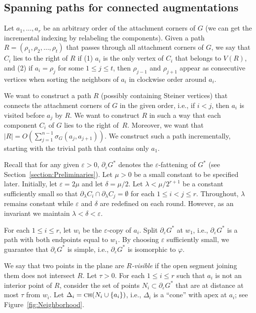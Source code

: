 \documentclass[a4paper, 11pt]{article}
\newcommand{\ch}[1]{\ensuremath{\textsc{ch}(#1)}}
\begin{document}
\subsection{Spanning paths for connected augmentations}\label{section:Spanning paths for connected augmentations}
Let $a_1, \ldots, a_r$ be an arbitrary order of the attachment corners of $G$ (we can get the incremental indexing by relabeling the components). 
Given a path $R = (\rho_1, \rho_2, \ldots, \rho_t)$ that passes through all attachment corners of $G$, we say that $C_i$ lies to the right of $R$ if (1) $a_i$ is the only vertex of $C_i$ that belongs to $V(R)$, and (2) if $a_i = \rho_j$ for some $1\leq j\leq t$, then $\rho_{j-1}$ and $\rho_{j+1}$ appear as consecutive vertices when sorting the neighbors of $a_i$ in clockwise order around $a_i$.

We want to construct a path $R$ (possibly containing Steiner vertices) that connects the attachment corners of $G$ in the given order, i.e., if $i < j$, then $a_i$ is visited before $a_j$ by $R$.
We want to construct $R$ in such a way that each component $C_i$ of $G$ lies to the right of~$R$.
Moreover, we want that $|R| = O(\sum_{j=1}^{n-1} \sigma_G(a_j, a_{j+1}))$.
We construct such a path incrementally, starting with the trivial path that contains only $a_1$.

Recall that  for any given $\varepsilon >0$, $\partial_\varepsilon G^*$ denotes the $\varepsilon$-fattening of $G^*$ (see Section~\ref{section:Preliminaries}). 
Let $\mu>0$ be a small constant to be specified later.
Initially, let $\varepsilon = 2\mu$ and let $\delta = \mu/2$. Let $\lambda < \mu/2^{r+1}$ be a constant sufficiently small so that $\partial_\lambda C_i \cap \partial_\lambda C_j = \emptyset$ for each $1\leq i< j\leq r$.
Throughout, $\lambda$ remains constant while $\varepsilon$ and $\delta$ are redefined on each round. However, as an invariant we maintain $\lambda < \delta < \varepsilon$.

For each $1\leq i\leq r$, let $w_i$ be the $\varepsilon$-copy of  $a_i$.
Split $\partial_\varepsilon G^*$ at $w_1$, i.e., $\partial_\varepsilon G^*$ is a path with both endpoints equal to $w_1$.
By choosing $\varepsilon$ sufficiently small, we guarantee that $\partial_\varepsilon G^*$ is simple, i.e., $\partial_\varepsilon G^*$ is isomorphic to $\varphi$.

We say that two points in the plane are \emph{$R$-visible} if the open segment joining them does not intersect $R$.
Let $\tau >0$. For each $1\leq i\leq r$ such that $a_i$ is not an interior point of $R$, consider the set of points $N_i\subset \partial_\varepsilon G^*$ that are at distance at most $\tau$ from $w_i$. 
Let $\Delta_i = \ch{N_i\cup \{a_i\}}$, i.e., $\Delta_i$ is a ``cone'' with apex at $a_i$; see Figure~\ref{fig:Neighborhood}.
\end{document}

